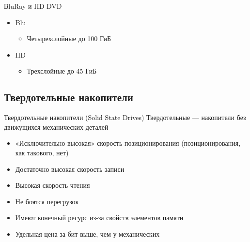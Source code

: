 \documentclass[xetex,aspectratio=43]{beamer}
\begin{document}
\begin{frame}
    \begin{block}{ВluRay и HD DVD}
        \begin{itemize}
            \tightlist
            \item
            Blu

            \begin{itemize}
                \tightlist
                \item
                Четырехслойные до 100 ГиБ
            \end{itemize}
            \item
            HD

            \begin{itemize}
                \tightlist
                \item
                Трехслойные до 45 ГиБ
            \end{itemize}
        \end{itemize}

    \end{block}
\end{frame}

\subsection{Твердотельные накопители}

\begin{frame}{Твердотельные накопители (Solid State Drives)}
    Твердотельные --- накопители без движущихся механических деталей

    \begin{itemize}
        \tightlist
        \item
        «Исключительно высокая» скорость позиционирования (позиционирования,
        как такового, нет)
        \item
        Достаточно высокая скорость записи
        \item
        Высокая скорость чтения
    \end{itemize}

    \pause

    \begin{itemize}
        \tightlist
        \item
        Не боятся перегрузок
        \item
        Имеют конечный ресурс из-за свойств элементов памяти
        \item
        Удельная цена за бит выше, чем у механических
    \end{itemize}

\end{frame}
\end{document}

